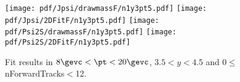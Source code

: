 \begin{figure}[H]
\begin{center}
\texttt{[image: pdf/Jpsi/drawmassF/n1y3pt5.pdf]}
\texttt{[image: pdf/Jpsi/2DFitF/n1y3pt5.pdf]}
\vspace*{-0.5cm}
\texttt{[image: pdf/Psi2S/drawmassF/n1y3pt5.pdf]}
\texttt{[image: pdf/Psi2S/2DFitF/n1y3pt5.pdf]}
\vspace*{-0.5cm}
\end{center}
\caption{Fit results in $8\gevc<\pt<20\gevc$, $3.5<y<4.5$ and 0$\leq$nForwardTracks$<$12.}
\label{Fitn1y3pt5}
\end{figure}
